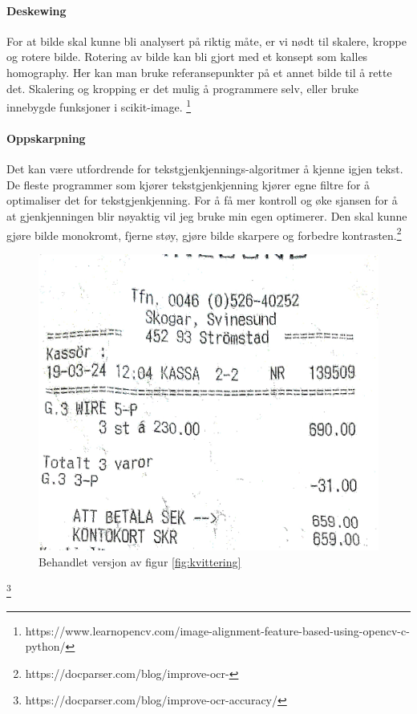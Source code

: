 \documentclass{article}
\begin{document}
\paragraph{Deskewing}
For at bilde skal kunne bli analysert på riktig måte, er vi nødt til skalere, kroppe og rotere bilde. Rotering av bilde kan bli gjort med et konsept som kalles homography. Her kan man bruke referansepunkter på et annet bilde til å rette det. Skalering og kropping er det mulig å programmere selv, eller bruke innebygde funksjoner i scikit-image. \footnote{https://www.learnopencv.com/image-alignment-feature-based-using-opencv-c-python/}
\paragraph{Oppskarpning}
Det kan være utfordrende for tekstgjenkjennings-algoritmer å kjenne igjen tekst. De fleste programmer som kjører tekstgjenkjenning kjører egne filtre for å optimaliser det for tekstgjenkjenning. For å få mer kontroll og øke sjansen for å at gjenkjenningen blir nøyaktig vil jeg bruke min egen optimerer. Den skal kunne gjøre bilde monokromt, fjerne støy, gjøre bilde skarpere og forbedre kontrasten.\footnote{https://docparser.com/blog/improve-ocr-}
\begin{figure}[h!]
\centering
\includegraphics[scale=0.2]{images/test_image_threated.jpg}
\caption{Behandlet versjon av figur \ref{fig:kvittering}}
\label{fig:behandlet_kvittering}
\end{figure}
\footnote{https://docparser.com/blog/improve-ocr-accuracy/}
\end{document}
